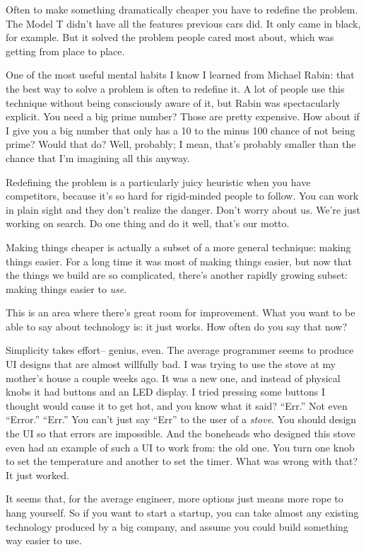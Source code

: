 Often to make something dramatically cheaper you have to redefine the
problem. The Model T didn't have all the features previous cars did. It
only came in black, for example. But it solved the problem people cared
most about, which was getting from place to place.

One of the most useful mental habits I know I learned from Michael
Rabin: that the best way to solve a problem is often to redefine it. A
lot of people use this technique without being consciously aware of it,
but Rabin was spectacularly explicit. You need a big prime number? Those
are pretty expensive. How about if I give you a big number that only has
a 10 to the minus 100 chance of not being prime? Would that do? Well,
probably; I mean, that's probably smaller than the chance that I'm
imagining all this anyway.

Redefining the problem is a particularly juicy heuristic when you have
competitors, because it's so hard for rigid-minded people to follow. You
can work in plain sight and they don't realize the danger. Don't worry
about us. We're just working on search. Do one thing and do it well,
that's our motto.

Making things cheaper is actually a subset of a more general technique:
making things easier. For a long time it was most of making things
easier, but now that the things we build are so complicated, there's
another rapidly growing subset: making things easier to \emph{use}.

This is an area where there's great room for improvement. What you want
to be able to say about technology is: it just works. How often do you
say that now?

Simplicity takes effort-- genius, even. The average programmer seems to
produce UI designs that are almost willfully bad. I was trying to use
the stove at my mother's house a couple weeks ago. It was a new one, and
instead of physical knobs it had buttons and an LED display. I tried
pressing some buttons I thought would cause it to get hot, and you know
what it said? ``Err.'' Not even ``Error.'' ``Err.'' You can't just say
``Err'' to the user of a \emph{stove}. You should design the UI so that
errors are impossible. And the boneheads who designed this stove even
had an example of such a UI to work from: the old one. You turn one knob
to set the temperature and another to set the timer. What was wrong with
that? It just worked.

It seems that, for the average engineer, more options just means more
rope to hang yourself. So if you want to start a startup, you can take
almost any existing technology produced by a big company, and assume you
could build something way easier to use.

